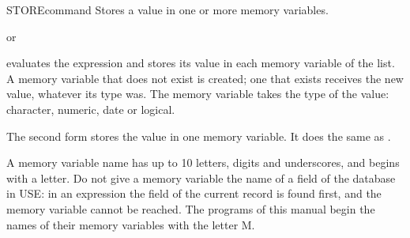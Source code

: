 \begin{XbaseEntry}{STORE}{command}
Stores a value in one or more memory variables.
\Syntax
{}
\par or\par
{}
\Usage
{} evaluates the expression and stores its value in each memory
variable of the list.  A memory variable that does not exist is created; one
that exists receives the new value, whatever its type was.  The memory
variable takes the type of the value: character, numeric, date or logical.

The second form stores the value in one memory variable.  It does the same as
.

A memory variable name has up to 10 letters, digits and underscores, and
begins with a letter.  Do not give a memory variable the name of a field of the
database in USE: in an expression the field of the current record is found
first, and the memory variable cannot be reached.  The programs of this manual
begin the names of their memory variables with the letter M.
\Examples
{}
\end{XbaseEntry}


